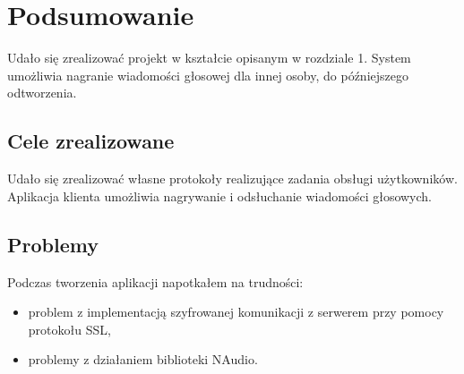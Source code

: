 \documentclass[12pt,a4paper]{article}
\begin{document}
	\pagebreak
	\section{Podsumowanie}
	\par Udało się zrealizować projekt w kształcie opisanym w rozdziale 1. System umożliwia nagranie wiadomości głosowej dla innej osoby, do późniejszego odtworzenia.
		
	\subsection{Cele zrealizowane}
	\par Udało się zrealizować własne protokoły realizujące zadania obsługi użytkowników. Aplikacja klienta umożliwia nagrywanie i odsłuchanie wiadomości głosowych. 
	
	\subsection{Problemy}
	Podczas tworzenia aplikacji napotkałem na trudności:
	\begin{itemize}
		\item problem z implementacją szyfrowanej komunikacji z serwerem przy pomocy protokołu SSL,
		\item problemy z działaniem biblioteki NAudio.
	\end{itemize}
	
\end{document}
